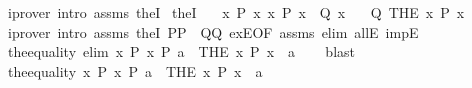 \begin{isabellebody}
\ {\isacharparenleft}{\kern0pt}iprover\ intro{\isacharcolon}{\kern0pt}\ assms\ theI{\isacharparenright}{\kern0pt}%
\endisatagproof
{\isafoldproof}%
%
\isadelimproof
\isanewline
%
\endisadelimproof
\isanewline
{}\isamarkupfalse%
\ the{}I{}{\isacharcolon}{\kern0pt}\isanewline
\ \ \ {\isachardoublequoteopen}{\isasymexists}{\isacharbang}{\kern0pt}x{\isachardot}{\kern0pt}\ P\ x{\isachardoublequoteclose}\ {\isachardoublequoteopen}{\isasymAnd}x{\isachardot}{\kern0pt}\ P\ x\ {\isasymLongrightarrow}\ Q\ x{\isachardoublequoteclose}\isanewline
\ \ \ {\isachardoublequoteopen}Q\ {\isacharparenleft}{\kern0pt}THE\ x{\isachardot}{\kern0pt}\ P\ x{\isacharparenright}{\kern0pt}{\isachardoublequoteclose}\isanewline
%
\isadelimproof
\ \ %
\endisadelimproof
%
\isatagproof
{}\isamarkupfalse%
\ {\isacharparenleft}{\kern0pt}iprover\ intro{\isacharcolon}{\kern0pt}\ assms{\isacharparenleft}{\kern0pt}{}{\isacharparenright}{\kern0pt}\ theI{}{\isacharbrackleft}{\kern0pt}\ P{\isacharequal}{\kern0pt}P\ \ Q{\isacharequal}{\kern0pt}Q{\isacharbrackright}{\kern0pt}\ ex{}E{\isacharbrackleft}{\kern0pt}OF\ assms{\isacharparenleft}{\kern0pt}{}{\isacharparenright}{\kern0pt}{\isacharbrackright}{\kern0pt}\ elim{\isacharcolon}{\kern0pt}\ allE\ impE{\isacharparenright}{\kern0pt}%
\endisatagproof
{\isafoldproof}%
%
\isadelimproof
\isanewline
%
\endisadelimproof
\isanewline
{}\isamarkupfalse%
\ the{}{\isacharunderscore}{\kern0pt}equality\ {\isacharbrackleft}{\kern0pt}elim{\isacharquery}{\kern0pt}{\isacharbrackright}{\kern0pt}{\isacharcolon}{\kern0pt}\ {\isachardoublequoteopen}{\isasymlbrakk}{\isasymexists}{\isacharbang}{\kern0pt}x{\isachardot}{\kern0pt}\ P\ x{\isacharsemicolon}{\kern0pt}\ P\ a{\isasymrbrakk}\ {\isasymLongrightarrow}\ {\isacharparenleft}{\kern0pt}THE\ x{\isachardot}{\kern0pt}\ P\ x{\isacharparenright}{\kern0pt}\ {\isacharequal}{\kern0pt}\ a{\isachardoublequoteclose}\isanewline
%
\isadelimproof
\ \ %
\endisadelimproof
%
\isatagproof
{}\isamarkupfalse%
\ blast%
\endisatagproof
{\isafoldproof}%
%
\isadelimproof
\isanewline
%
\endisadelimproof
\isanewline
{}\isamarkupfalse%
\ the{}{\isacharunderscore}{\kern0pt}equality{\isacharprime}{\kern0pt}{\isacharcolon}{\kern0pt}\ {\isachardoublequoteopen}{\isasymlbrakk}{\isasymexists}\isactrlsub {\isasymle}x{\isachardot}{\kern0pt}\ P\ x{\isacharsemicolon}{\kern0pt}\ P\ a{\isasymrbrakk}\ {\isasymLongrightarrow}\ {\isacharparenleft}{\kern0pt}THE\ x{\isachardot}{\kern0pt}\ P\ x{\isacharparenright}{\kern0pt}\ {\isacharequal}{\kern0pt}\ a{\isachardoublequoteclose}\isanewline

\end{isabellebody}
